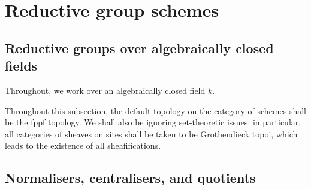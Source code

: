 \section{Reductive group schemes}
    \subsection{Reductive groups over algebraically closed fields}
        \begin{convention}
            Throughout, we work over an algebraically closed field $k$.
        \end{convention}
        
        \begin{convention}
            Throughout this subsection, the default topology on the category of schemes shall be the fppf topology. We shall also be ignoring set-theoretic issues: in particular, all categories of sheaves on sites shall be taken to be Grothendieck topoi, which leads to the existence of all sheafifications. 
        \end{convention}

    \subsection{Normalisers, centralisers, and quotients}

